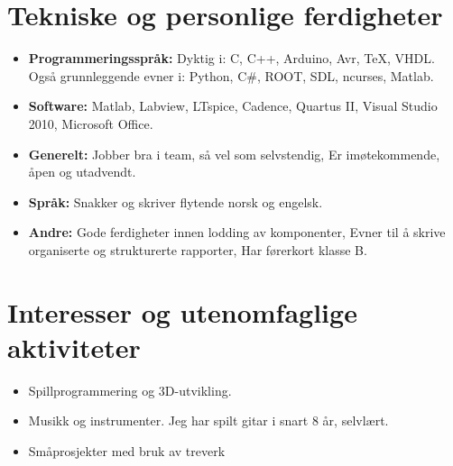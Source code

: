 \documentclass[11pt,a4paper,sans,norsk]{moderncv}        %
\begin{document}
\section{Tekniske og personlige ferdigheter}

\vspace{6pt}

\begin{itemize}

\item \textbf{Programmeringsspråk:} Dyktig i: C, C++, Arduino, Avr, TeX, VHDL. \\ Også grunnleggende evner i: Python, C\#, ROOT, SDL, ncurses, Matlab.

\vspace{6pt}

\item \textbf{Software:} Matlab, Labview, LTspice, Cadence, Quartus II, Visual Studio 2010, Microsoft Office.

\vspace{6pt}

\item \textbf{Generelt:} Jobber bra i team, så vel som selvstendig, Er imøtekommende, åpen og utadvendt.

\vspace{6pt}

\item \textbf{Språk:} Snakker og skriver flytende norsk og engelsk.

\vspace{6pt}

\item \textbf{Andre:} Gode ferdigheter innen lodding av komponenter, Evner til å skrive organiserte og strukturerte rapporter, Har førerkort klasse B.

\end{itemize}


\section{Interesser og utenomfaglige aktiviteter}

\vspace{6pt}

\begin{itemize}

\item{Spillprogrammering og 3D-utvikling.}

\vspace{6pt}

\item{Musikk og instrumenter. Jeg har spilt gitar i snart 8 år, selvlært.}

\vspace{6pt}

\item{Småprosjekter med bruk av treverk}



\end{itemize}
\end{document}
